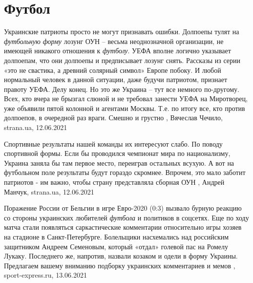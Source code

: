  
 
 
 
 
\chapter{Футбол}
\label{sec:slova.futbol}

Украинские патриоты просто не могут признавать ошибки.  Долпоепы тулят на
\emph{футбольную форму} лозунг ОУН – весьма неоднозначной организации, не имеющей
никакого отношения к \emph{футболу}. УЕФА вполне логично указывает долпоепам, что они
долпоепы и предписывает лозунг снять. Рассказы из серии «это не свастика, а
древний солярный символ» Европе побоку. И любой нормальный человек в данной
ситуации, даже будучи патриотом, признает правоту УЕФА. Делу конец.  Но это же
Украина – тут все немного по-другому. Всех, кто вчера не брызгал слюной и не
требовал занести УЕФА на Миротворец, уже объявили пятой колонной и агентами
Москвы. Т.е. по итогу все, кто против долпоепов, в очередной раз враги. Смешно
и грустно
, 
Вячеслав Чечило, strana.ua, 12.06.2021

Спортивные результаты нашей команды их интересуют слабо. По поводу спортивной
формы. Если бы проводился чемпионат мира по национализму, Украина заняла бы
там первое место, переиграв остальных всухую. А вот на футбольном поле
результаты будут гораздо скромнее.  Впрочем, это мало заботит патриотов - им
важно, чтобы страну представляла сборная ОУН
, 
Андрей Манчук, strana.ua, 12.06.2021

Поражение России от Бельгии в игре Евро-2020 (0:3) вызвало бурную реакцию со
стороны украинских любителей \emph{футбола} и политиков в соцсетях. Еще по ходу
матча стали появляться саркастические комментарии относительно игры хозяев на
стадионе в Санкт-Петербурге. Болельщики насхемались над российским защитником
Андреем Семеновым, который «отдал» голевой пас на Ромелу Лукаку. Последнего же,
напротив, назвали козаком и одели в форму Украины.  Предлагаем вашему вниманию
подборку украинских комментариев и мемов
,
sport-express.ru, 13.06.2021

